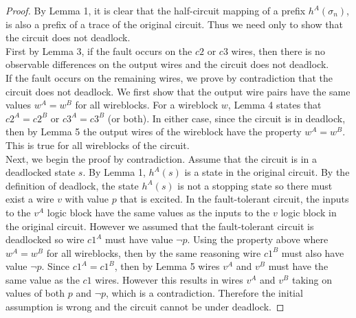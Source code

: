 \documentclass[12pt]{report}
\begin{document}
\begin{proof}
By Lemma 1, it is clear that the half-circuit mapping of a prefix $h^{A}(\sigma_n)$, is also a prefix of a trace of the original circuit.  Thus we need only to show that the circuit does not deadlock.\\

First by Lemma 3, if the fault occurs on the $c2$ or $c3$ wires, then there is no observable differences on the output wires and the circuit does not deadlock.\\ 

If the fault occurs on the remaining wires, we prove by contradiction that the circuit does not deadlock.  We first show that the output wire pairs have the same values $w^A = w^B$ for all wireblocks.  For a wireblock $w$, Lemma 4 states that $c2^A=c2^B$ or $c3^A=c3^B$ (or both).  In either case, since the circuit is in deadlock, then by Lemma 5 the output wires of the wireblock have the property $w^A = w^B$.  This is true for all wireblocks of the circuit.\\%

Next, we begin the proof by contradiction.  Assume that the circuit is in a deadlocked state $s$.  By Lemma 1, $h^A(s)$ is a state in the original circuit.  By the definition of deadlock, the state $h^A(s)$ is not a stopping state so there must exist a wire $v$ with value $p$ that is excited.  In the fault-tolerant circuit, the inputs to the $v^A$ logic block have the same values as the inputs to the $v$ logic block in the original circuit.  However we assumed that the fault-tolerant circuit is deadlocked so wire $c1^A$ must have value $\neg{p}$.  Using the property above where $w^A = w^B$ for all wireblocks, then by the same reasoning wire $c1^B$ must also have value $\neg{p}$.  Since $c1^A=c1^B$, then by Lemma 5 wires $v^A$ and $v^B$ must have the same value as the $c1$ wires.  
However this results in wires $v^A$ and $v^B$ taking on values of both $p$ and $\neg{p}$, which is a contradiction.  Therefore the initial assumption is wrong and the circuit cannot be under deadlock.

\end{proof}
\end{document}
